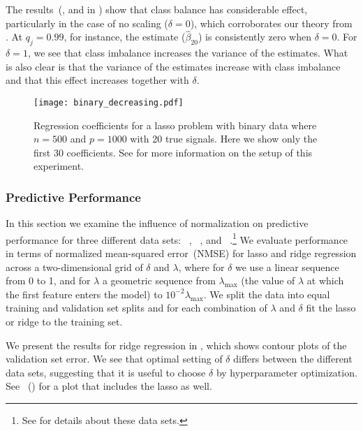 The results~(, and  in
) show that class balance has considerable effect,
particularly in the case of no scaling (\(\delta = 0\)), which corroborates our theory from
. At \(q_j=0.99\), for instance, the estimate
(\(\hat{\beta}_{20}\)) is consistently zero when \(\delta = 0\). For \(\delta=1\), we see
that class imbalance increases the variance of the estimates. What is also clear is that
the variance of the estimates increase with class imbalance and that this effect increases
together with \(\delta\).

\begin{figure}[htpb]
  \centering
  \texttt{[image: binary\_decreasing.pdf]}
  \caption{%
    Regression coefficients for a lasso problem with binary data where \(n = 500\) and
    \(p = \num{1000}\) with 20 true signals. Here we show only the first 30
    coefficients. See  for more information
    on the setup of this experiment.
  }
  \label{fig:binary-decreasing}
\end{figure}

\subsubsection{Predictive Performance}

In this section we examine the influence of normalization on predictive performance for
three different data sets: ~\citep{becker1996}, ~\citep{rhee2006},
and ~\citep{platt1998}.\footnote{See  for details about
  these data sets.} We evaluate performance in terms of normalized mean-squared error~(NMSE)
for lasso and ridge regression across a two-dimensional grid of \(\delta\) and \(\lambda\),
where for \(\delta\) we use a linear sequence from 0 to 1, and for \(\lambda\) a geometric
sequence from \(\lambda_\text{max}\) (the value of \(\lambda\) at which the first feature
enters the model) to \(10^{-2}\lambda_\text{max}\). We split the data into equal training
and validation set splits and for each combination of \(\lambda\) and \(\delta\) fit the
lasso or ridge to the training set.

We present the results for ridge regression in , which shows
contour plots of the validation set error. We see that optimal setting of \(\delta\)
differs between the different data sets, suggesting that it is useful to choose \(\delta\)
by hyperparameter optimization. See
~() for a plot
that includes the lasso as well.

